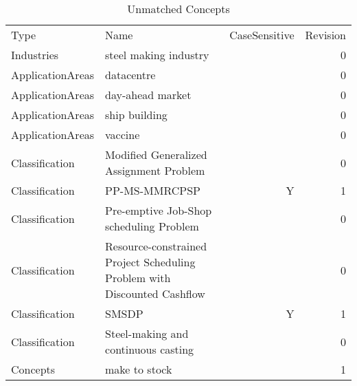 {\scriptsize
\begin{longtable}{lp{10cm}rr}
\rowcolor{white}\caption{Unmatched Concepts}\\ \toprule
\rowcolor{white}Type & Name & CaseSensitive & Revision\\ \midrule
\endhead
\bottomrule
\endfoot
Industries & steel making industry &  & 0\\ApplicationAreas & datacentre &  & 0\\ApplicationAreas & day-ahead market &  & 0\\ApplicationAreas & ship building &  & 0\\ApplicationAreas & vaccine &  & 0\\Classification & Modified Generalized Assignment Problem &  & 0\\Classification & PP-MS-MMRCPSP & Y & 1\\Classification & Pre-emptive Job-Shop scheduling Problem &  & 0\\Classification & Resource-constrained Project Scheduling Problem with Discounted Cashflow &  & 0\\Classification & SMSDP & Y & 1\\Classification & Steel-making and continuous casting &  & 0\\Concepts & make to stock &  & 1\\\end{longtable}
}

